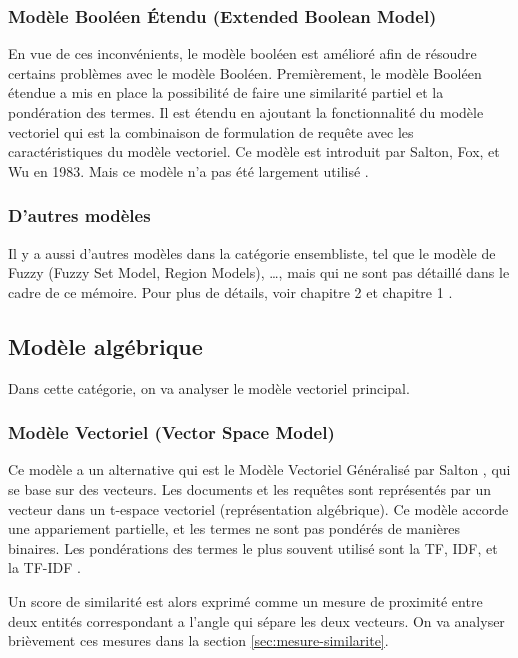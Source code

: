 \subsubsection{Modèle Booléen Étendu (Extended Boolean Model)}
En vue de ces inconvénients, le modèle booléen est amélioré afin de résoudre certains problèmes avec le modèle Booléen. Premièrement, le modèle Booléen étendue a mis en place la possibilité de faire une similarité partiel et la pondération des termes. Il est étendu en ajoutant la fonctionnalité du modèle vectoriel qui est la combinaison de formulation de requête avec les caractéristiques du modèle vectoriel. Ce modèle est introduit par Salton, Fox, et Wu en 1983. Mais ce modèle n'a pas été largement utilisé \citep{modern-ir}.

\subsubsection{D'autres modèles}
Il y a aussi d'autres modèles dans la catégorie ensembliste, tel que le modèle de Fuzzy (Fuzzy Set Model, Region Models), \dots, mais qui ne sont pas détaillé dans le cadre de ce mémoire. Pour plus de détails, voir chapitre 2 \citep{modern-ir} et chapitre 1 \citep{model-ir}.

\subsection{Modèle algébrique}
Dans cette catégorie, on va analyser le modèle vectoriel principal.

\subsubsection{Modèle Vectoriel (Vector Space Model)}
\label{sec:vsm-model}

Ce modèle a un alternative qui est le Modèle Vectoriel Généralisé par Salton \citep{salton1975vector}, qui se base sur des vecteurs. Les documents et les requêtes sont représentés par un vecteur dans un t-espace vectoriel (représentation algébrique). Ce modèle accorde une appariement partielle, et les termes ne sont pas pondérés de manières binaires. Les pondérations des termes le plus souvent utilisé sont la TF, IDF, et la TF-IDF \citep*{sarch-engine-vsm}.

Un score de similarité est alors exprimé comme un mesure de proximité entre deux entités correspondant a l'angle qui sépare les deux vecteurs. On va analyser brièvement ces mesures dans la section \ref{sec:mesure-similarite}.

